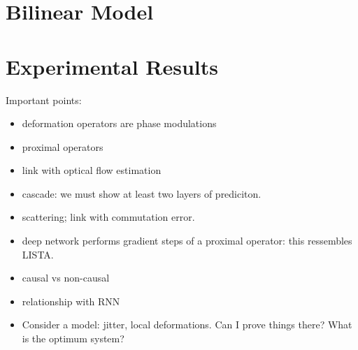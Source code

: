 \documentclass[11pt]{article} %
\begin{document}
\section{Bilinear Model}


\section{Experimental Results}






Important points:

\begin{itemize}
\item deformation operators are phase modulations 
\item proximal operators
\item link with optical flow estimation
\item cascade: we must show at least two layers of prediciton.
\item scattering; link with commutation error.
\item deep network performs gradient steps of a proximal operator: this ressembles LISTA.
\item causal vs non-causal
\item relationship with RNN
\item Consider a model: jitter, local deformations. Can I prove things there? What is the optimum system?
\end{itemize}
\end{document}
